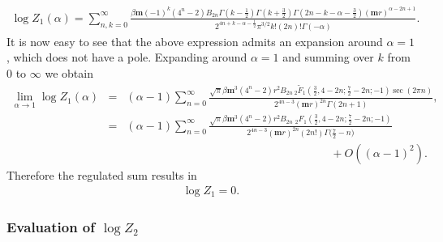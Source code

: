 \documentclass[a4paper,11pt]{article}
\begin{document}
\begin{align}
	\log Z_1(\alpha)
	=	\sum_{n,k=0}^{\infty}
	\frac{\beta\mathbf m  (-1)^k  \left(4^n-2\right) B_{2 n} \Gamma \left(k-\frac{1}{2}\right) \Gamma \left(k+\frac{3}{2}\right)  \Gamma \left(2 n-k-\alpha -\frac{3}{2}\right) (\mathbf m r)^{\alpha -2 n+1}}{2^{4n+k-\alpha-\frac{1}{2}}\pi ^{3/2} k! (2 n)! \Gamma (-\alpha )}.
\end{align}
It is now easy to see that the above expression admits an expansion around $\alpha =1$, which does not have a pole. 
Expanding around  $\alpha=1$ and summing over $k$ from $0$ to $\infty$ we obtain
\begin{eqnarray}
	\lim_{\alpha\to 1}\log Z_1(\alpha)&=& (\alpha -1) \sum_{n=0}^{\infty}
	\frac{\sqrt{\pi }  \beta  \mathbf m^3 \left(4^n-2\right) r^2 B_{2 n} \, _2\tilde{F}_1\left(\frac{3}{2},4-2 n;\frac{7}{2}-2 n;-1\right) \sec (2 \pi  n)}{2^{4n-3}(\mathbf mr)^{2n}\Gamma (2 n+1)}, \nonumber \\ \nonumber
	& =&    (\alpha -1) \sum_{n=0}^{\infty}
	\frac{\sqrt{\pi }  \beta  \mathbf m^3 \left(4^n-2\right) r^2 B_{2 n} \;  _2{F}_1\left(\frac{3}{2},4-2 n;\frac{7}{2}-2 n;-1\right) }{2^{4n-3}(\mathbf mr)^{2n} ( 2n !) \Gamma\big( \frac{7}{2} - n \big) } \nonumber\\&&\qquad\qquad\qquad\qquad\qquad\qquad\qquad\qquad\qquad+ O( (\alpha -1)^2). 
\end{eqnarray}
Therefore the regulated sum results in 
\begin{align}\label{z1 zero}
	\log Z_1=0.
\end{align}

\subsubsection*{Evaluation of $\log Z_2$}
\end{document}
